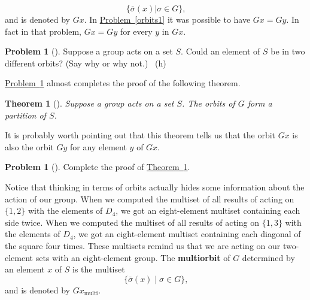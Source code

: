 \documentclass[10pt,]{book}
\newcommand{\terminology}[1]{\textbf{#1}}
\theoremstyle{plain}
\newtheorem{theorem}{Theorem}[section]
\theoremstyle{definition}
\newtheorem{activity}[project]{Problem}
\theoremstyle{definition}
\numberwithin{equation}{chapter}
\begin{document}
\begin{equation*}
\{\overline{\sigma}(x)| \sigma \in G\}\text{,}
\end{equation*}
and is denoted by \(Gx\). In \hyperref[orbits1]{Problem~\ref{orbits1}} it was possible to have \(Gx = Gy\). In fact in that problem, \(Gx = Gy\) for every \(y\) in \(Gx\).%
\begin{activity}[]\marginsymbol[-1em]{} \label{disjoint-orbits}
\hypertarget{p-1643}{}%
Suppose a group acts on a set \(S\). Could an element of \(S\) be in two different orbits? (Say why or why not.)%
~{\tiny (h)}\end{activity}
\hypertarget{p-1647}{}%
\hyperref[disjoint-orbits]{Problem~\ref{disjoint-orbits}} almost completes the proof of the following theorem.%
\begin{theorem}[{}]\label{thm-orbits-partition}
\hypertarget{p-1648}{}%
Suppose a group acts on a set \(S\). The orbits of \(G\) form a partition of \(S\).%
\end{theorem}
\hypertarget{p-1649}{}%
It is probably worth pointing out that this theorem tells us that the orbit \(Gx\) is also the orbit \(Gy\) for any element \(y\) of \(Gx\).%
\begin{activity}[]\marginsymbol[-1em]{} \label{activity-290}
\hypertarget{p-1650}{}%
Complete the proof of \hyperref[thm-orbits-partition]{Theorem~\ref{thm-orbits-partition}}.%
\end{activity}
\hypertarget{p-1652}{}%
Notice that thinking in terms of orbits actually hides some information about the action of our group. When we computed the multiset of all results of acting on \(\{1, 2\}\) with the elements of \(D_4\), we got an eight-element multiset containing each side twice. When we computed the multiset of all results of acting on \(\{1,3\}\) with the elements of \(D_4\), we got an eight-element multiset containing each diagonal of the square four times. These multisets remind us that we are acting on our two-element sets with an eight-element group. The \terminology{multiorbit} of \(G\) determined by an element \(x\) of \(S\) is the multiset%
\begin{equation*}
\{\overline{\sigma}(x)\mid \sigma \in G\}\text{,}
\end{equation*}
and is denoted by \(Gx_{\text{multi}}\).%
\par
\hypertarget{p-1653}{}%
\end{document}
